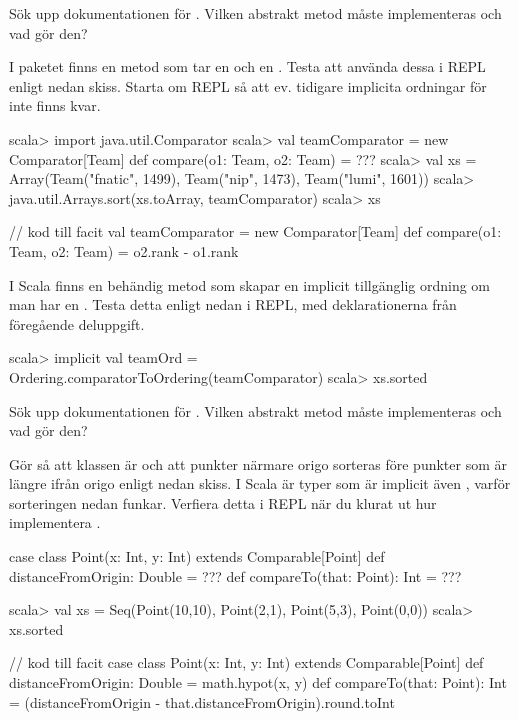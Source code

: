 \Subtask\Pen Sök upp dokumentationen för . Vilken abstrakt metod måste implementeras och vad gör den? 

\Subtask  I paketet  finns en metod  som tar en  och en . Testa att använda dessa i REPL enligt nedan skiss. Starta om REPL så att ev. tidigare implicita ordningar för  inte finns kvar.
\begin{REPL}
scala> import java.util.Comparator
scala> val teamComparator = new Comparator[Team]{
         def compare(o1: Team, o2: Team) = ???
       }
scala> val xs = 
         Array(Team("fnatic", 1499), Team("nip", 1473), Team("lumi", 1601))
scala> java.util.Arrays.sort(xs.toArray, teamComparator)
scala> xs
\end{REPL}
\begin{Code}
// kod till facit
val teamComparator = new Comparator[Team]{
  def compare(o1: Team, o2: Team) = o2.rank - o1.rank
}
\end{Code}

\Subtask I Scala finns en behändig metod  som skapar en implicit tillgänglig ordning om man har en . Testa detta enligt nedan i REPL, med deklarationerna från föregående deluppgift.
\begin{REPL}
scala> implicit val teamOrd = Ordering.comparatorToOrdering(teamComparator)
scala> xs.sorted
\end{REPL}



\Subtask\Pen Sök upp dokumentationen för . Vilken abstrakt metod måste implementeras och vad gör den? 

\Subtask Gör så att klassen  är  och att punkter närmare origo sorteras före punkter som är längre ifrån origo enligt nedan skiss. I Scala är typer som är  implicit även , varför sorteringen nedan funkar. Verfiera detta i REPL när du klurat ut hur implementera . 

\begin{Code}
case class Point(x: Int, y: Int) extends Comparable[Point] {
  def distanceFromOrigin: Double = ???
  def compareTo(that: Point): Int = ???
}
\end{Code}
\begin{REPL}
scala> val xs = Seq(Point(10,10), Point(2,1), Point(5,3), Point(0,0))
scala> xs.sorted
\end{REPL}
\begin{Code}
// kod till facit
case class Point(x: Int, y: Int) extends Comparable[Point] {
  def distanceFromOrigin: Double = math.hypot(x, y)
  def compareTo(that: Point): Int = 
    (distanceFromOrigin - that.distanceFromOrigin).round.toInt
}
\end{Code}



